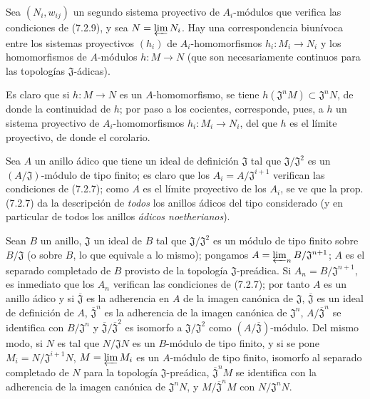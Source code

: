 \begin{corollary}[7.2.10]
\label{0.7.2.10-fr}
Sea $(N_i,w_{ij})$ un segundo sistema proyectivo de $A_i$-módulos que verifica las
condiciones de \textup{(7.2.9)}, y sea $N=\varprojlim N_i$. Hay una correspondencia
biunívoca entre los sistemas proyectivos $(h_i)$ de $A_i$-homomorfismos
$h_i:M_i\to N_i$ y los homomorfismos de $A$-módulos $h:M\to N$ (que son
necesariamente continuos para las topologías $\mathfrak J$-ádicas).
\end{corollary}

Es claro que si $h:M\to N$ es un $A$-homomorfismo, se tiene
$h(\mathfrak J^nM)\subset\mathfrak J^nN$, de donde la continuidad de $h$; por
paso a los cocientes, corresponde, pues, a $h$ un sistema proyectivo de
$A_i$-homomorfismos $h_i:M_i\to N_i$, del que $h$ es el límite proyectivo,
de donde el corolario.

\begin{remark}[7.2.11]
\label{0.7.2.11-fr}
Sea $A$ un anillo ádico que tiene un ideal de definición $\mathfrak J$ tal que
$\mathfrak J/\mathfrak J^2$ es un $(A/\mathfrak J)$-módulo de tipo finito;
es claro que los $A_i=A/\mathfrak J^{i+1}$ verifican
las condiciones de (7.2.7); como $A$ es el límite proyectivo de los $A_i$, se
ve que la prop. (7.2.7) da la descripción de \emph{todos} los anillos
ádicos del tipo considerado (y en particular de todos los anillos
\emph{ádicos noetherianos}).
\end{remark}

\begin{example}[7.2.12]
\label{0.7.2.12-fr}
Sean $B$ un anillo, $\mathfrak J$ un ideal de $B$ tal que
$\mathfrak J/\mathfrak J^2$ es un módulo de tipo finito sobre
$B/\mathfrak J$ (o sobre $B$, lo que equivale a lo mismo); pongamos
$A=\varprojlim_n B/\mathfrak J^{n+1}$; $A$ es el separado completado de $B$
provisto de la topología $\mathfrak J$-preádica. Si
$A_n=B/\mathfrak J^{n+1}$, es inmediato que los $A_n$ verifican las
condiciones de (7.2.7); por tanto $A$ es un anillo ádico y si
$\overline{\mathfrak J}$ es la adherencia en $A$ de la imagen canónica de
$\mathfrak J$, $\overline{\mathfrak J}$ es un ideal de definición de $A$,
$\overline{\mathfrak J}^n$ es la adherencia de la imagen canónica de
$\mathfrak J^n$, $A/\overline{\mathfrak J}^n$ se identifica con
$B/\mathfrak J^n$ y
$\overline{\mathfrak J}/\overline{\mathfrak J}^2$ es isomorfo a
$\mathfrak J/\mathfrak J^2$ como
$(A/\overline{\mathfrak J})$-módulo. Del mismo modo, si $N$ es tal que
$N/\mathfrak JN$ es un $B$-módulo de tipo finito, y si se pone
$M_i=N/\mathfrak J^{i+1}N$, $M=\varprojlim M_i$ es un $A$-módulo de tipo
finito, isomorfo al separado completado de $N$ para la topología
$\mathfrak J$-preádica, $\overline{\mathfrak J}^nM$ se identifica con
la adherencia de la imagen canónica de $\mathfrak J^nN$, y
$M/\overline{\mathfrak J}^nM$ con $N/\mathfrak J^nN$.
\end{example}

